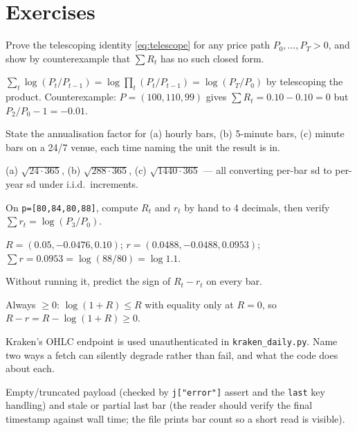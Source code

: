 \section*{Exercises}
\begin{exercise}[easy]
Prove the telescoping identity \eqref{eq:telescope} for any price
path $P_0,\dots,P_T>0$, and show by counterexample that $\sum R_t$
has no such closed form.
\end{exercise}
\begin{solution}
$\sum_t\log(P_t/P_{t-1})=\log\prod_t(P_t/P_{t-1})=\log(P_T/P_0)$ by
telescoping the product. Counterexample: $P=(100,110,99)$ gives
$\sum R_t=0.10-0.10=0$ but $P_2/P_0-1=-0.01$.
\end{solution}
\begin{exercise}[easy]
State the annualisation factor for (a) hourly bars, (b) 5-minute
bars, (c) minute bars on a 24/7 venue, each time naming the unit the
result is in.
\end{exercise}
\begin{solution}
(a) $\sqrt{24\cdot365}$, (b) $\sqrt{288\cdot365}$, (c)
$\sqrt{1440\cdot365}$ --- all converting per-bar sd to per-year sd
under i.i.d.\ increments.
\end{solution}
\begin{exercise}[easy]
On \texttt{p=[80,84,80,88]}, compute $R_t$ and $r_t$ by hand to 4
decimals, then verify $\sum r_t=\log(P_3/P_0)$.
\end{exercise}
\begin{solution}
$R=(0.05,-0.0476,0.10)$; $r=(0.0488,-0.0488,0.0953)$;
$\sum r=0.0953=\log(88/80)=\log 1.1$.
\end{solution}
\begin{exercise}[easy]
Without running it, predict the sign of $R_t-r_t$ on every bar.
\end{exercise}
\begin{solution}
Always $\ge0$: $\log(1+R)\le R$ with equality only at $R=0$, so
$R-r=R-\log(1+R)\ge0$.
\end{solution}
\begin{exercise}[easy]
Kraken's OHLC endpoint is used unauthenticated in
\texttt{kraken\_daily.py}. Name two ways a fetch can silently degrade
rather than fail, and what the code does about each.
\end{exercise}
\begin{solution}
Empty/truncated payload (checked by \texttt{j["error"]} assert and
the \texttt{last} key handling) and stale or partial last bar
(the reader should verify the final timestamp against wall time;
the file prints bar count so a short read is visible).
\end{solution}

